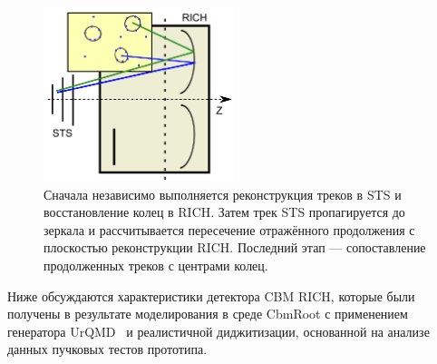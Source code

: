 \begin{figure}[H]
\centering
\includegraphics[width=0.495\textwidth]{pictures/STS_RICH_reco.png}
\caption{Сначала независимо выполняется реконструкция треков в STS и восстановление колец в RICH. Затем трек STS пропагируется до зеркала и рассчитывается пересечение отражённого продолжения с плоскостью реконструкции RICH. Последний этап --- сопоставление продолженных треков с центрами колец.}
\label{fig:StsRichReco}
\end{figure}


Ниже обсуждаются характеристики детектора CBM RICH, которые были получены в результате моделирования в среде CbmRoot с применением генератора UrQMD~\cite{URQMD} и реалистичной диджитизации, основанной на анализе данных пучковых тестов прототипа.

